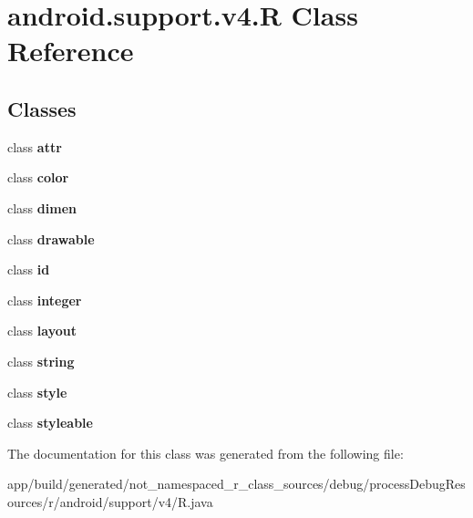 \hypertarget{classandroid_1_1support_1_1v4_1_1_r}{}\section{android.\+support.\+v4.\+R Class Reference}
\label{classandroid_1_1support_1_1v4_1_1_r}
\subsection*{Classes}
\begin{DoxyCompactItemize}
\item 
class {\bfseries attr}
\item 
class {\bfseries color}
\item 
class {\bfseries dimen}
\item 
class {\bfseries drawable}
\item 
class {\bfseries id}
\item 
class {\bfseries integer}
\item 
class {\bfseries layout}
\item 
class {\bfseries string}
\item 
class {\bfseries style}
\item 
class {\bfseries styleable}
\end{DoxyCompactItemize}


The documentation for this class was generated from the following file\+:\begin{DoxyCompactItemize}
\item 
app/build/generated/not\+\_\+namespaced\+\_\+r\+\_\+class\+\_\+sources/debug/process\+Debug\+Resources/r/android/support/v4/R.\+java\end{DoxyCompactItemize}
